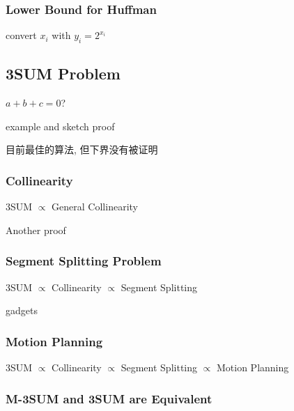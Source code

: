 
\subsubsection{Lower Bound for Huffman}
convert $x_i$ with $y_i=2^{x_i}$


\subsection{3SUM Problem}
$a+b+c=0$?

example and sketch proof

目前最佳的算法, 但下界没有被证明

\subsubsection{Collinearity}
3SUM $\propto$ General Collinearity




Another proof 



\subsubsection{Segment Splitting Problem}
3SUM $\propto$ Collinearity $\propto$ Segment Splitting

gadgets 


\subsubsection{Motion Planning}
3SUM $\propto$ Collinearity $\propto$ Segment Splitting $\propto$ Motion Planning



\subsubsection{M-3SUM and 3SUM are Equivalent}
